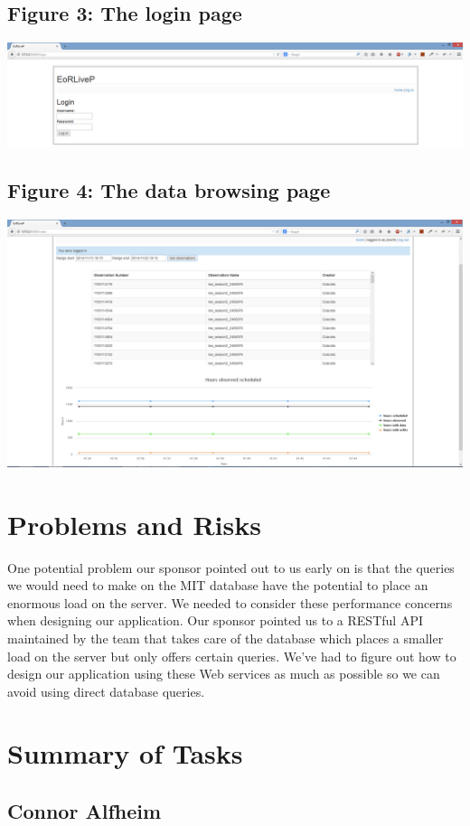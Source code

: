 \documentclass[12pt]{article}
\begin{document}
\begin{spacing}{1.5}
\subsection{Figure 3: The login page}
\includegraphics[width=\textwidth]{screenshot1}

\subsection{Figure 4: The data browsing page}
\includegraphics[width=\textwidth]{screenshot2}
\section{Problems and Risks}
One potential problem our sponsor pointed out to us early on is that the queries we would need to make on the MIT database have the potential to place an enormous load on the server. We needed to consider these performance concerns when designing our application. Our sponsor pointed us to a RESTful API maintained by the team that takes care of the database which places a smaller load on the server but only offers certain queries. We've had to figure out how to design our application using these Web services as much as possible so we can avoid using direct database queries.
\clearpage
\section{Summary of Tasks}

\subsection{Connor Alfheim}

\end{spacing}
\end{document}
